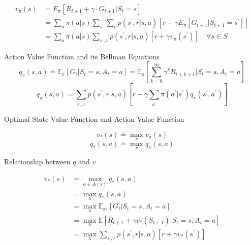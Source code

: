 \documentclass{article}
\begin{document}
\begin{equation}
\begin{aligned}
v_{\pi}(s) &= E_{\pi}[R_{t+1}+\gamma \cdot G_{t+1} | S_{t}=s] \\
&= \sum_{a} \pi(a | s) \sum_{s^{\prime}} \sum_{r} p(s^{\prime}, r|s, a)[r+\gamma E_{\pi}[G_{t+1} | S_{t+1}=s^{\prime}]]\\
&=\sum_{a} \pi(a | s) \sum_{s^{\prime}, r} p\left(s^{\prime}, r | s, a\right)\left[r+\gamma v_{\pi}\left(s^{\prime}\right)\right] \quad \forall s \in S
\end{aligned}
\end{equation}

\noindent
Action Value Function and its Bellman Equations
\begin{equation}
q_{\pi}(s, a) \doteq \mathbb{E}_{\pi}\left[G_{t} | S_{t}=s, A_{t}=a\right]=\mathbb{E}_{\pi}\left[\sum_{k=0}^{\infty} \gamma^{k} R_{t+k+1} | S_{t}=s, A_{t}=a\right]
\end{equation}
\begin{equation}
q_{\pi}(s, a)=\sum_{s^{\prime}, r} p\left(s^{\prime}, r | s, a\right)\left[r+\gamma \sum_{a^{\prime}} \pi\left(a^{\prime} | s^{\prime}\right) q_{\pi}\left(s^{\prime}, a^{\prime}\right)\right]
\end{equation}

\noindent
Optimal State Value Function and Action Value Function

\begin{equation}
v_{*}(s) \doteq \max _{\pi} v_{\pi}(s)
\end{equation}
\begin{equation}
q_{*}(s, a) \doteq \max _{\pi} q_{\pi}(s, a)
\end{equation}

\newpage
\noindent
Relationship between $q$ and $v$

\begin{equation}
\begin{aligned}
v_{*}(s) &=\max _{a \in A(s)} q_{*}(s, a)\\
&= \max _{a} q_{*}(s, a)\\
&= \max _{a} \mathbb{E}_{\pi_{*}}[G_{t} | S_{t} = s, A_{t} = a]\\
&= \max _{a} \mathbb{E}[R_{t+1} + \gamma v_{*}(S_{t+1}) | S_{t} = s, A_{t} = a]\\
&= \max _{a} \sum_{s^{\prime}, r} p(s^{\prime}, r | s, a)[r + \gamma v_{*}(s^{\prime})]
\end{aligned}
\end{equation}
\end{document}
